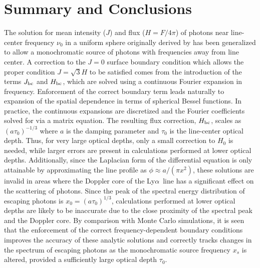 \documentclass{aastex63}
\newcommand\lya{Ly$\alpha$\ }
\begin{document}
\section{Summary and Conclusions}

The solution for mean intensity ($J$) and flux ($H = F/4\pi$) of photons near line-center frequency $\nu_0$ in a uniform sphere originally derived by \cite{2006ApJ...649...14D} has been generalized to allow a monochromatic source of photons with frequencies away from line center. A correction to the $J=0$ surface boundary condition which allows the proper condition $J=\sqrt{3}H$ to be satisfied comes from the introduction of the terms $J_{\rm bc}$ and $H_{\rm bc}$, which are solved using a continuous Fourier expansion in frequency. Enforcement of the correct boundary term leads naturally to expansion of the spatial dependence in terms of spherical Bessel functions. In practice, the continuous expansions are discretized and the Fourier coefficients solved for via a matrix equation. The resulting flux correction, $H_{\rm bc}$, scales as $(a\tau_0)^{-1/3}$ where $a$ is the damping parameter and $\tau_0$ is the line-center optical depth. Thus, for very large optical depths, only a small correction to $H_0$ is needed, while larger errors are present in calculations performed at lower optical depths. Additionally, since the Laplacian form of the differential equation is only attainable by approximating the line profile as $\phi \approx a/(\pi x^2)$, these solutions are invalid in areas where the Doppler core of the \lya line has a significant effect on the scattering of photons. Since the peak of the spectral energy distribution of escaping photons is $x_0 = (a\tau_0)^{1/3}$, calculations performed at lower optical depths are likely to be inaccurate due to the close proximity of the spectral peak and the Doppler core. By comparison with Monte Carlo simulations, it is seen that the enforcement of the correct frequency-dependent boundary conditions improves the accuracy of these analytic solutions and correctly tracks changes in the spectrum of escaping photons as the monochromatic source frequency $x_s$ is altered, provided a sufficiently large optical depth $\tau_0$.
\end{document}
